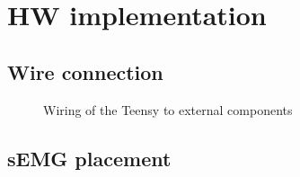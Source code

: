 \section{HW implementation}
\subsection*{Wire connection}
\begin{figure}[H]
    \centering

    \caption{Wiring of the Teensy to external components}
    \label{fig:motorSel}
\end{figure}
\subsection*{sEMG placement}


